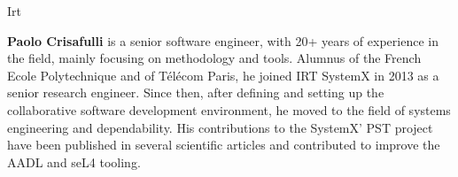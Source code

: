 \begin{sitedescription}{Irt}
\begin{compactitem}
\item{\bf Paolo Crisafulli} is a senior software engineer, with 20+ years of experience in the field, mainly focusing on methodology and tools. Alumnus of the French Ecole Polytechnique and of Télécom Paris, he joined IRT SystemX in 2013 as a senior research engineer. Since then, after defining and setting up the collaborative software development environment, he moved to the field of systems engineering and dependability. His contributions to the SystemX’ PST project have been published in several scientific articles and contributed to improve the AADL and seL4 tooling.

\end{compactitem}

\end{sitedescription}

